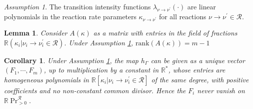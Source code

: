 \documentclass[10pt,a4paper]{amsart}
\theoremstyle{plain}
\newtheorem{lemma}[theorem]{Lemma}
\newtheorem{corollary}[theorem]{Corollary}
\theoremstyle{definition}
\theoremstyle{remark}
\newtheorem{assumption}{Assumption}
\def\Ga{\Gamma}
\def\R{\mathbb{R}}
\def\cR{\mathcal{R}}
\def\k{\kappa}
\def\la{\lambda}
\def\p{^{\prime}}
\begin{document}
\begin{assumption}\label{ass1}
The transition intensity functions $\la_{\nu \to \nu\p}(\cdot)$ are linear polynomials in the reaction rate parameters $\k_{\nu \to \nu\p}$ for all reactions $\nu \to \nu\p\in\cR$. 
\end{assumption}

 \begin{lemma}\label{clm}  Consider $A(\k)$ as a matrix with entries in the field of fractions $\R(\k_i|{\nu_i\to\nu_i\p}\in\cR)$. Under Assumption \ref{ass1}, $\mathrm{rank}(A(\k))=m-1$\end{lemma}

\begin{corollary}\label{clm2}
Under Assumption \ref{ass1}, the map $h_\Ga$ can be given as a unique vector $(F_1,\cdots , F_m)$, up to multiplication by a constant in $\R^*$, whose entries are homogeneous polynomials in $\R[\k_i|{\nu_i\to\nu_i\p}\in\cR]$ of the same degree, with positive coefficients and no non-constant common divisor.  Hence the $F_i$ never vanish on $\R\Pr_{>0}^\cR$. 
\end{corollary}
\end{document}
